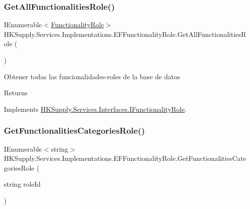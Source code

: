 \subsubsection{\texorpdfstring{Get\+All\+Functionalities\+Role()}{GetAllFunctionalitiesRole()}}
{\footnotesize\ttfamily I\+Enumerable$<$\mbox{\hyperlink{class_h_k_supply_1_1_models_1_1_functionality_role}{Functionality\+Role}}$>$ H\+K\+Supply.\+Services.\+Implementations.\+E\+F\+Functionality\+Role.\+Get\+All\+Functionalities\+Role (\begin{DoxyParamCaption}{ }\end{DoxyParamCaption})}



Obtener todas las funcionalidades-\/roles de la base de datos 

\begin{DoxyReturn}{Returns}

\end{DoxyReturn}


Implements \mbox{\hyperlink{interface_h_k_supply_1_1_services_1_1_interfaces_1_1_i_functionality_role}{H\+K\+Supply.\+Services.\+Interfaces.\+I\+Functionality\+Role}}.

\mbox{\label{class_h_k_supply_1_1_services_1_1_implementations_1_1_e_f_functionality_role_a1625ffb6313337132a446f831d357453}} 
\subsubsection{\texorpdfstring{Get\+Functionalities\+Categories\+Role()}{GetFunctionalitiesCategoriesRole()}}
{\footnotesize\ttfamily I\+Enumerable$<$string$>$ H\+K\+Supply.\+Services.\+Implementations.\+E\+F\+Functionality\+Role.\+Get\+Functionalities\+Categories\+Role (\begin{DoxyParamCaption}\item[{string}]{role\+Id }\end{DoxyParamCaption})}



